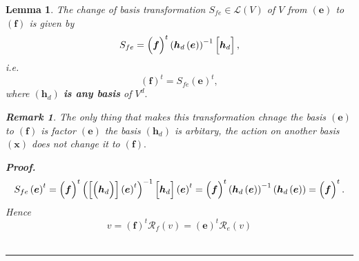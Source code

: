 \documentclass[aps,preprint]{revtex4}
\newtheorem{lemma}[theorem]{Lemma}
\newtheorem{remark}[theorem]{Remark}
\newenvironment{proof}[1][Proof]{\noindent\textbf{#1.} }{\ \rule{0.5em}{0.5em}}
\begin{document}
\begin{lemma}
The change of basis transformation $S_{fe}\in \mathcal{L}\left( V\right) $
of $V$ from $\left( \boldsymbol{e}\right) $ to $\left( \boldsymbol{f}\right) 
$ is given by 
\begin{equation}
S_{fe}=\left( \overset{}{\boldsymbol{f}}\right) ^{t}\left( \boldsymbol{h}%
_{d}\left( \overset{}{\boldsymbol{e}}\right) \right) ^{-1}\left[ \overset{}{%
\boldsymbol{h}_{d}}\right] ,
\end{equation}%
i.e. 
\begin{equation}
\left( \boldsymbol{f}\right) ^{t}=S_{fe}\left( \boldsymbol{e}\right) ^{t},
\end{equation}%
where $\left( \boldsymbol{h}_{d}\right) $ \textbf{is any basis} of $V^{d}.$

\begin{remark}
The only thing that makes this transformation chnage the basis $\left( 
\boldsymbol{e}\right) $ to $\left( \boldsymbol{f}\right) $ is factor $\left( 
\boldsymbol{e}\right) $ the basis $\left( \boldsymbol{h}_{d}\right) $ is
arbitary, the action on another basis $\left( \boldsymbol{x}\right) $ does
not change it to $\left( \boldsymbol{f}\right) .$
\end{remark}

\begin{proof}
\begin{equation}
S_{fe}\left( \overset{}{\boldsymbol{e}}\right) ^{t}=\left( \overset{}{%
\boldsymbol{f}}\right) ^{t}\left( \left[ \left( \overset{}{\boldsymbol{h}_{d}%
}\right) \right] \left( \overset{}{\boldsymbol{e}}\right) ^{t}\right) ^{-1}%
\left[ \overset{}{\boldsymbol{h}_{d}}\right] \left( \overset{}{\boldsymbol{e}%
}\right) ^{t}=\left( \overset{}{\boldsymbol{f}}\right) ^{t}\left( 
\boldsymbol{h}_{d}\left( \overset{}{\boldsymbol{e}}\right) \right)
^{-1}\left( \boldsymbol{h}_{d}\left( \overset{}{\boldsymbol{e}}\right)
\right) =\left( \overset{}{\boldsymbol{f}}\right) ^{t}.
\end{equation}%
Hence 
\begin{equation}
v=\left( \boldsymbol{f}\right) ^{t}\mathcal{R}_{f}\left( v\right) =\left( 
\boldsymbol{e}\right) ^{t}\mathcal{R}_{e}\left( v\right)
\end{equation}
\end{proof}
\end{lemma}
\end{document}
